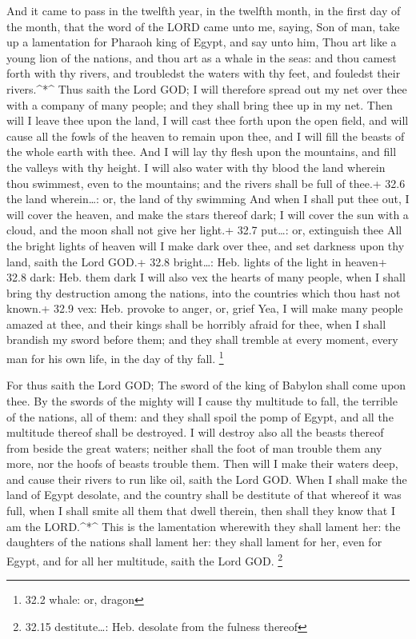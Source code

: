  And it came to pass in the twelfth year, in the twelfth
month, in the first day of the month, that the word of the LORD came
unto me, saying,  Son of man, take up a lamentation for
Pharaoh king of Egypt, and say unto him, Thou art like a young lion of
the nations, and thou art as a whale in the seas: and thou camest forth
with thy rivers, and troubledst the waters with thy feet, and fouledst
their rivers.\^{}*\^{}  Thus saith the Lord GOD; I will
therefore spread out my net over thee with a company of many people; and
they shall bring thee up in my net.  Then will I leave thee
upon the land, I will cast thee forth upon the open field, and will
cause all the fowls of the heaven to remain upon thee, and I will fill
the beasts of the whole earth with thee.  And I will lay thy
flesh upon the mountains, and fill the valleys with thy height.
 I will also water with thy blood the land wherein thou
swimmest, even to the mountains; and the rivers shall be full of thee.+
32.6 the land wherein\ldots: or, the land of thy swimming 
And when I shall put thee out, I will cover the heaven, and make the
stars thereof dark; I will cover the sun with a cloud, and the moon
shall not give her light.+ 32.7 put\ldots: or, extinguish thee
 All the bright lights of heaven will I make dark over thee,
and set darkness upon thy land, saith the Lord GOD.+ 32.8 bright\ldots:
Heb. lights of the light in heaven+ 32.8 dark: Heb. them dark
 I will also vex the hearts of many people, when I shall
bring thy destruction among the nations, into the countries which thou
hast not known.+ 32.9 vex: Heb. provoke to anger, or, grief
 Yea, I will make many people amazed at thee, and their
kings shall be horribly afraid for thee, when I shall brandish my sword
before them; and they shall tremble at every moment, every man for his
own life, in the day of thy fall. \footnote{32.2 whale: or, dragon}

 For thus saith the Lord GOD; The sword of the king of
Babylon shall come upon thee.  By the swords of the mighty
will I cause thy multitude to fall, the terrible of the nations, all of
them: and they shall spoil the pomp of Egypt, and all the multitude
thereof shall be destroyed.  I will destroy also all the
beasts thereof from beside the great waters; neither shall the foot of
man trouble them any more, nor the hoofs of beasts trouble them.
 Then will I make their waters deep, and cause their rivers
to run like oil, saith the Lord GOD.  When I shall make the
land of Egypt desolate, and the country shall be destitute of that
whereof it was full, when I shall smite all them that dwell therein,
then shall they know that I am the LORD.\^{}*\^{}  This is
the lamentation wherewith they shall lament her: the daughters of the
nations shall lament her: they shall lament for her, even for Egypt, and
for all her multitude, saith the Lord GOD. \footnote{32.15
  destitute\ldots: Heb. desolate from the fulness thereof}

